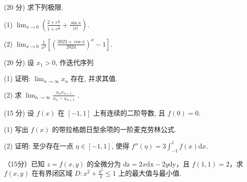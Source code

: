 \par{}
(20 分) 求下列极限.\par
(1) $\lim_{x\to 0}\left(\frac{2 + e^{\frac{1}{x}}}{1 + e^{\frac{4}{x}}} +\frac{\sin x}{|x|}\right).$\par
(2) $\lim_{x\to 0}\frac{1}{x^3}\left[\left(\frac{2023 + \cos x}{2024}\right)^x -1\right].$\par
\par{}
\par{}
(20 分) 设 $x_{1} > 0$, 作迭代序列\par
\nopagebreak[4]
(1) 证明: $\lim_{n\to \infty}x_n$ 存在, 并求其值.\par
(2) 求  $\lim_{n\to\infty}\frac{x_{n}x_{n+1}}{x_{n}-x_{n+1}}$ .\par
\par{}
(15 分) 设 $f(x)$ 在 $[-1, 1]$ 上有连续的二阶导数, 且 $f(0) = 0$.\par
(1) 写出 $f(x)$ 的带拉格朗日型余项的一阶麦克劳林公式.\par
(2) 证明: 至少存在一点 $\eta \in [-1, 1]$, 使得 $f''(\eta) = 3\int_{-1}^{1} f(x) \mathrm{d}x$.\par
\par{}
（15分）已知 $z = f(x,y)$ 的全微分为 $\mathrm{dz} = 2x\mathrm{dx} - 2y\mathrm{dy}$，且 $f(1,1) = 2$，求 $f(x,y)$ 在有界闭区域 $D: x^2 + \frac{y^2}{4} \leq 1$ 上的最大值与最小值.\par
\par{}
\par{}
